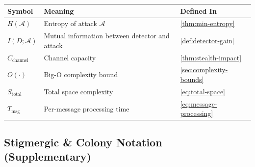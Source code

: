 \documentclass[
]{article}
\newcounter{none} %
\begin{document}
{\def\LTcaptype{none} %
\begin{longtable}[]{@{}
  >{\raggedright\arraybackslash}p{}
  >{\raggedright\arraybackslash}p{}
  >{\raggedright\arraybackslash}p{}@{}}
\toprule\noalign{}
\begin{minipage}[b]{\linewidth}\raggedright
Symbol
\end{minipage} & \begin{minipage}[b]{\linewidth}\raggedright
Meaning
\end{minipage} & \begin{minipage}[b]{\linewidth}\raggedright
Defined In
\end{minipage} \\
\midrule\noalign{}
\endhead
\bottomrule\noalign{}
\endlastfoot
\(H(\mathcal{A})\) & Entropy of attack \(\mathcal{A}\) &
\cref{thm:min-entropy} \\
\(I(D; \mathcal{A})\) & Mutual information between detector and attack &
\cref{def:detector-gain} \\
\(C_{\text{channel}}\) & Channel capacity & \cref{thm:stealth-impact} \\
\(O(\cdot)\) & Big-O complexity bound & \cref{sec:complexity-bounds} \\
\(S_{\text{total}}\) & Total space complexity & \cref{eq:total-space} \\
\(T_{\text{msg}}\) & Per-message processing time &
\cref{eq:message-processing} \\
\end{longtable}
}

\subsection{Stigmergic \& Colony Notation
(Supplementary)}\label{stigmergic-colony-notation-supplementary}
\end{document}
